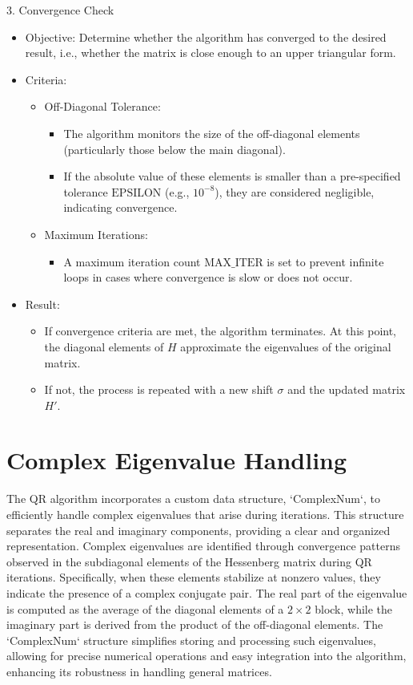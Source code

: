 \documentclass[a4paper,11pt,oneside]{report}
\begin{document}
 3. Convergence Check
 \begin{itemize}
   \item Objective: Determine whether the algorithm has converged to the desired result, i.e., whether the matrix is close enough to an upper triangular form.

   \item Criteria:
   \begin{itemize}
       \item Off-Diagonal Tolerance:
       \begin{itemize}
           \item The algorithm monitors the size of the off-diagonal elements (particularly those below the main diagonal).
           \item If the absolute value of these elements is smaller than a pre-specified tolerance \( \text{EPSILON} \) (e.g., \( 10^{-8} \)), they are considered negligible, indicating convergence.
       \end{itemize}
       \item Maximum Iterations:
       \begin{itemize}
           \item A maximum iteration count \( \text{MAX\_ITER} \) is set to prevent infinite loops in cases where convergence is slow or does not occur.
       \end{itemize}
   \end{itemize}

   \item Result:
   \begin{itemize}
       \item If convergence criteria are met, the algorithm terminates. At this point, the diagonal elements of \( H \) approximate the eigenvalues of the original matrix.
       \item If not, the process is repeated with a new shift \( \sigma \) and the updated matrix \( H' \).
   \end{itemize}
\end{itemize}
\section{ Complex Eigenvalue Handling}
The QR algorithm incorporates a custom data structure, `ComplexNum`, to efficiently handle complex eigenvalues that arise during iterations. This structure separates the real and imaginary components, providing a clear and organized representation. Complex eigenvalues are identified through convergence patterns observed in the subdiagonal elements of the Hessenberg matrix during QR iterations. Specifically, when these elements stabilize at nonzero values, they indicate the presence of a complex conjugate pair. The real part of the eigenvalue is computed as the average of the diagonal elements of a \( 2 \times 2 \) block, while the imaginary part is derived from the product of the off-diagonal elements. The `ComplexNum` structure simplifies storing and processing such eigenvalues, allowing for precise numerical operations and easy integration into the algorithm, enhancing its robustness in handling general matrices.
\end{document}
